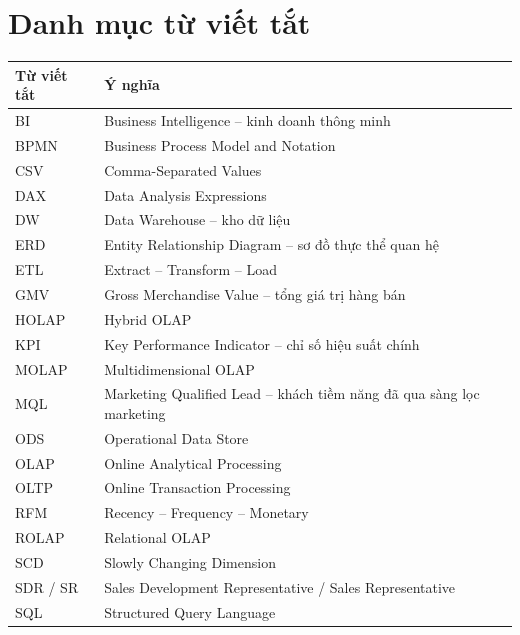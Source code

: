 \chapter*{Danh mục từ viết tắt}
\begin{longtable}{p{3cm}p{12cm}}
\toprule \textbf{Từ viết tắt} & \textbf{Ý nghĩa}\\ \midrule
BI & Business Intelligence -- kinh doanh thông minh\\
BPMN & Business Process Model and Notation\\
CSV & Comma-Separated Values\\
DAX & Data Analysis Expressions\\
DW & Data Warehouse -- kho dữ liệu\\
ERD & Entity Relationship Diagram -- sơ đồ thực thể quan hệ\\
ETL & Extract -- Transform -- Load\\
GMV & Gross Merchandise Value -- tổng giá trị hàng bán\\
HOLAP & Hybrid OLAP\\
KPI & Key Performance Indicator -- chỉ số hiệu suất chính\\
MOLAP & Multidimensional OLAP\\
MQL & Marketing Qualified Lead -- khách tiềm năng đã qua sàng lọc marketing\\
ODS & Operational Data Store\\
OLAP & Online Analytical Processing\\
OLTP & Online Transaction Processing\\
RFM & Recency -- Frequency -- Monetary\\
ROLAP & Relational OLAP\\
SCD & Slowly Changing Dimension\\
SDR / SR & Sales Development Representative / Sales Representative\\
SQL & Structured Query Language\\
\bottomrule
\end{longtable}

